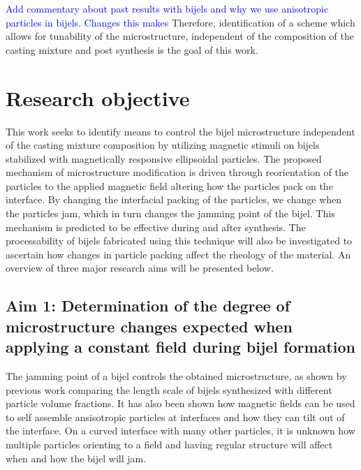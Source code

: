\textcolor{blue}{Add commentary about past results with bijels and why we use anisotropic particles in bijels. Changes this makes} Therefore, identification of a scheme which allows for tunability of the microstructure, independent of the composition of the casting mixture and post synthesis is the goal of this work.

\section{Research objective}

This work seeks to identify means to control the bijel microstructure independent of the casting mixture composition by utilizing magnetic stimuli on bijels stabilized with magnetically responsive ellipsoidal particles. The proposed mechanism of microstructure modification is driven through reorientation of the particles to the applied magnetic field altering how the particles pack on the interface. By changing the interfacial packing of the particles, we change when the particles jam, which in turn changes the jamming point of the bijel. This mechanism is predicted to be effective during and after synthesis. The processability of bijels fabricated using this technique will also be investigated to ascertain how changes in particle packing affect the rheology of the material. An overview of three major research aims will be presented below.


\subsection{Aim 1: Determination of the degree of microstructure changes expected when applying a constant field during bijel formation}
\label{section:aim1_desc}

The jamming point of a bijel controls the obtained microstructure, as shown by previous work comparing the length scale of bijels synthesized with different particle volume fractions. It has also been shown how magnetic fields can be used to self assemble ansisotropic particles at interfaces and how they can tilt out of the interface. \cite{davies_interface_2014, davies_assembling_2014} On a curved interface with many other particles, it is unknown how multiple particles orienting to a field and having regular structure will affect when and how the bijel will jam. \cite{bresme_orientational_2007, davies_interface_2014}

